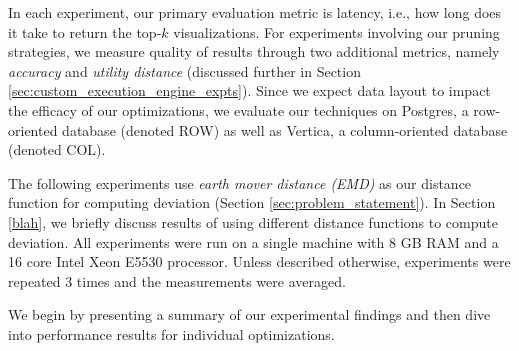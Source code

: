 In each experiment, our primary evaluation metric is latency, i.e., 
how long does it take \SeeDB to return the top-$k$ visualizations. 
For experiments involving our pruning strategies, we measure quality of results through two additional
metrics, namely {\it accuracy} and {\it utility distance} (discussed further in Section 
\ref{sec:custom_execution_engine_expts}).
Since we expect data layout to impact the efficacy of our optimizations, we 
evaluate our techniques on Postgres, a row-oriented database (denoted ROW) as well as Vertica, 
a column-oriented database (denoted COL).

The following experiments use {\it earth mover distance (EMD)} as our distance function for
computing deviation (Section \ref{sec:problem_statement}).
In Section \ref{blah}, we briefly discuss results of using different distance functions to
compute deviation.
All experiments were run on a single machine with 8 GB RAM and a 16 core Intel 
Xeon E5530 processor. 
Unless described otherwise, experiments were repeated 3 times and the measurements 
were averaged.

We begin by presenting a summary of our experimental findings and then dive into performance results 
for individual optimizations.












